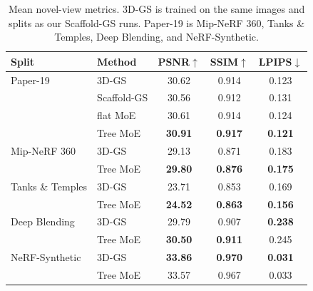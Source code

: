 \begin{table}[t]
\centering
\caption{Mean novel-view metrics. 3D-GS is trained on the same images and splits as our Scaffold-GS runs. Paper-19 is Mip-NeRF 360, Tanks \& Temples, Deep Blending, and NeRF-Synthetic.}
\label{tab:mean}
\setlength{\tabcolsep}{4pt}
\begin{tabular}{llccc}
\toprule
Split & Method & PSNR$\uparrow$ & SSIM$\uparrow$ & LPIPS$\downarrow$ \\
\midrule
Paper-19 & 3D-GS & 30.62 & 0.914 & 0.123 \\
 & Scaffold-GS & 30.56 & 0.912 & 0.131 \\
 & flat MoE & 30.61 & 0.914 & 0.124 \\
 & Tree MoE & \textbf{30.91} & \textbf{0.917} & \textbf{0.121} \\
\midrule
Mip-NeRF 360 & 3D-GS & 29.13 & 0.871 & 0.183 \\
 & Tree MoE & \textbf{29.80} & \textbf{0.876} & \textbf{0.175} \\
Tanks \& Temples & 3D-GS & 23.71 & 0.853 & 0.169 \\
 & Tree MoE & \textbf{24.52} & \textbf{0.863} & \textbf{0.156} \\
Deep Blending & 3D-GS & 29.79 & 0.907 & \textbf{0.238} \\
 & Tree MoE & \textbf{30.50} & \textbf{0.911} & 0.245 \\
NeRF-Synthetic & 3D-GS & \textbf{33.86} & \textbf{0.970} & \textbf{0.031} \\
 & Tree MoE & 33.57 & 0.967 & 0.033 \\
\bottomrule
\end{tabular}
\end{table}


